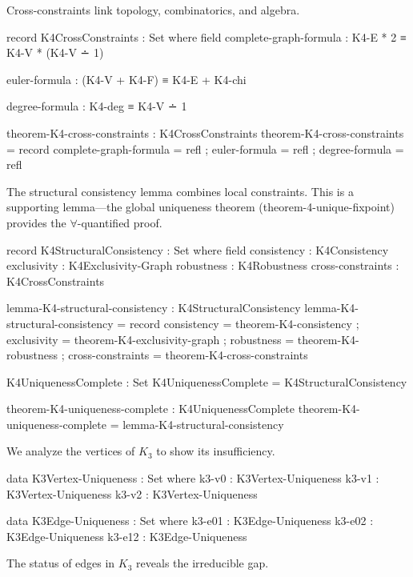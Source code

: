 \documentclass[11pt,a4paper]{book}
\def\texttt#1{#1}%
\begin{document}
Cross-constraints link topology, combinatorics, and algebra.

\begin{code}
record K4CrossConstraints : Set where
  field
    complete-graph-formula : K4-E * 2 ≡ K4-V * (K4-V ∸ 1)
    
    euler-formula          : (K4-V + K4-F) ≡ K4-E + K4-chi
    
    degree-formula         : K4-deg ≡ K4-V ∸ 1

theorem-K4-cross-constraints : K4CrossConstraints
theorem-K4-cross-constraints = record
  { complete-graph-formula = refl
  ; euler-formula          = refl
  ; degree-formula         = refl
  }
\end{code}

The structural consistency lemma combines local constraints. This is a supporting lemma---the global uniqueness theorem (\texttt{theorem-4-unique-fixpoint}) provides the $\forall$-quantified proof.

\begin{code}
record K4StructuralConsistency : Set where
  field
    consistency       : K4Consistency
    exclusivity       : K4Exclusivity-Graph
    robustness        : K4Robustness
    cross-constraints : K4CrossConstraints

lemma-K4-structural-consistency : K4StructuralConsistency
lemma-K4-structural-consistency = record
  { consistency       = theorem-K4-consistency
  ; exclusivity       = theorem-K4-exclusivity-graph
  ; robustness        = theorem-K4-robustness
  ; cross-constraints = theorem-K4-cross-constraints
  }

K4UniquenessComplete : Set
K4UniquenessComplete = K4StructuralConsistency

theorem-K4-uniqueness-complete : K4UniquenessComplete
theorem-K4-uniqueness-complete = lemma-K4-structural-consistency
\end{code}

We analyze the vertices of $K_3$ to show its insufficiency.

\begin{code}
data K3Vertex-Uniqueness : Set where
  k3-v0 : K3Vertex-Uniqueness
  k3-v1 : K3Vertex-Uniqueness
  k3-v2 : K3Vertex-Uniqueness

data K3Edge-Uniqueness : Set where
  k3-e01 : K3Edge-Uniqueness
  k3-e02 : K3Edge-Uniqueness
  k3-e12 : K3Edge-Uniqueness
\end{code}

The status of edges in $K_3$ reveals the irreducible gap.
\end{document}
